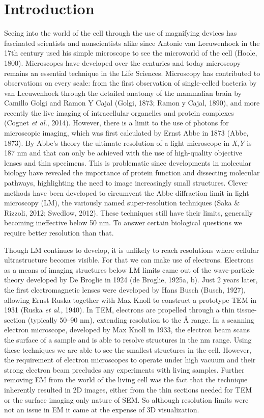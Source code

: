 \documentclass{article}
\begin{document}
\section*{Introduction}

Seeing into the world of the cell through the use of magnifying devices has fascinated scientists and nonscientists alike since Antonie van Leeuwenhoek in the 17th century used his simple microscope to see the microworld of the cell (Hoole, 1800). Microscopes have developed over the centuries and today microscopy remains an essential technique in the Life Sciences. Microscopy has contributed to observations on every scale: from the first observation of single-celled bacteria by van Leeuwenhoek through the detailed anatomy of the mammalian brain by Camillo Golgi and Ramon Y Cajal (Golgi, 1873; Ramon y Cajal, 1890), and more recently the live imaging of intracellular organelles and protein complexes (Cognet \textit{et al.}, 2014). However, there is a limit to the use of photons for microscopic imaging, which was first calculated by Ernst Abbe in 1873 (Abbe, 1873). By Abbe’s theory the ultimate resolution of a light microscope in \textit{X},\textit{Y} is 187 nm and that can only be achieved with the use of high-quality objective lenses and thin specimens. This is problematic since developments in molecular biology have revealed the importance of protein function and dissecting molecular pathways, highlighting the need to image increasingly small structures. Clever methods have been developed to circumvent the Abbe diffraction limit in light microscopy (LM), the variously named super-resolution techniques (Saka \& Rizzoli, 2012; Swedlow, 2012). These techniques still have their limits, generally becoming ineffective below 50 nm. To answer certain biological questions we require better resolution than that.

Though LM continues to develop, it is unlikely to reach resolutions where cellular ultrastructure becomes visible. For that we can make use of electrons. Electrons as a means of imaging structures below LM limits came out of the wave-particle theory developed by De Broglie in 1924 (de Broglie, 1925a, b). Just 2 years later, the first electromagnetic lenses were developed by Hans Busch (Busch, 1927), allowing Ernst Ruska together with Max Knoll to construct a prototype TEM in 1931 (Ruska \textit{et al.}, 1940). In TEM, electrons are propelled through a thin tissue-section (typically 50–90 nm), extending resolution to the Å range. In a scanning electron microscope, developed by Max Knoll in 1933, the electron beam scans the surface of a sample and is able to resolve structures in the nm range. Using these techniques we are able to see the smallest structures in the cell. However, the requirement of electron microscopes to operate under high vacuum and their strong electron beam precludes any experiments with living samples. Further removing EM from the world of the living cell was the fact that the technique inherently resulted in 2D images, either from the thin sections needed for TEM or the surface imaging only nature of SEM. So although resolution limits were not an issue in EM it came at the expense of 3D visualization.
\end{document}
